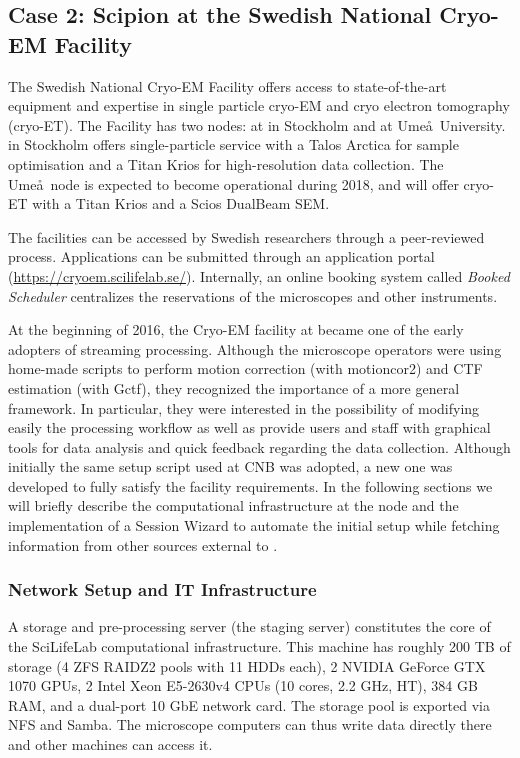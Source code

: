 
\subsection{Case 2: Scipion at the Swedish National Cryo-EM Facility}

The Swedish National Cryo-EM Facility offers access to state-of-the-art equipment and expertise in single particle cryo-EM and cryo electron tomography (cryo-ET). The Facility has two nodes: at \scilifelab in Stockholm and at Ume\aa\ University. \scilifelab in Stockholm offers single-particle service with a 
Talos Arctica for sample optimisation and a Titan Krios for high-resolution data collection. The Ume\aa\ node is expected to become operational during 2018, and will offer cryo-ET with a Titan Krios and a Scios DualBeam SEM.

The facilities can be accessed by Swedish researchers through 
a peer-reviewed process. Applications can be submitted through an application portal (\url{https://cryoem.scilifelab.se/}). %
Internally, an online booking system called \emph{Booked Scheduler} centralizes the reservations of the microscopes and other instruments. 

At the beginning of 2016, the Cryo-EM facility at \scilifelab became one of the early adopters of \scipion streaming processing. Although the microscope operators were using home-made scripts to perform motion correction (with motioncor2) and CTF estimation (with Gctf), they recognized the importance of a more general
framework. In particular, they were interested in the possibility of modifying easily the processing workflow as well as provide users and staff with  graphical tools for data analysis and quick feedback regarding the data collection.
Although initially the same setup script used at
CNB was adopted, a new one was developed to fully satisfy the facility
requirements. In the following sections we will briefly describe the computational infrastructure at the \scilifelab node and the implementation of a Session Wizard to automate the initial setup while fetching information from other sources external to \scipion. 

\subsubsection{Network Setup and IT Infrastructure}
A storage and pre-processing server (the staging
server) constitutes the core of the SciLifeLab computational infrastructure.
 This machine has roughly 200 TB of storage (4 ZFS RAIDZ2 pools with 11 HDDs each), 2 NVIDIA GeForce GTX 1070 GPUs, 2 Intel Xeon E5-2630v4 CPUs (10 cores, 2.2 GHz, HT), 384 GB RAM, and a dual-port 10 GbE network card. The storage pool is exported via NFS and Samba. The microscope computers can thus write data directly there and other machines can access it.
 

